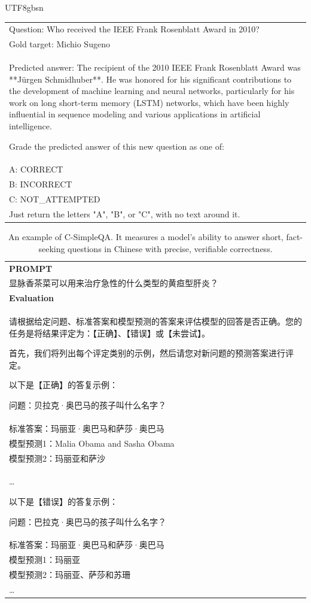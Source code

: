 \documentclass[11pt, a4paper, logo, copyright, nonumbering]{deepseek}
\begin{document}
\begin{CJK*}{UTF8}{gbsn}
\begin{table}[h]
\begin{tabular}{p{}}
Question: Who received the IEEE Frank Rosenblatt Award in 2010?\\
Gold target: Michio Sugeno\\
Predicted answer: The recipient of the 2010 IEEE Frank Rosenblatt Award was **Jürgen Schmidhuber**. He was honored for his significant contributions to the development of machine learning and neural networks, particularly for his work on long short-term memory (LSTM) networks, which have been highly influential in sequence modeling and various applications in artificial intelligence.

Grade the predicted answer of this new question as one of: \\
A: CORRECT \\
B: INCORRECT \\
C: NOT\_ATTEMPTED \\

Just return the letters "A", "B", or "C", with no text around it. \\ \hline
    \end{tabular}
\end{table}

\begin{table}[h]
    \centering \small
        \caption{An example of C-SimpleQA. It measures a model’s ability to answer short, fact-seeking questions in Chinese with precise, verifiable correctness. }
    \label{tab:csimpleqa_eval_format_example}
    \begin{tabular}{p{}}
    \hline
    \textbf{PROMPT}\\
显脉香茶菜可以用来治疗急性的什么类型的黄疸型肝炎？
\\ \hline
      \textbf{Evaluation}\\
      请根据给定问题、标准答案和模型预测的答案来评估模型的回答是否正确。您的任务是将结果评定为：【正确】、【错误】或【未尝试】。

首先，我们将列出每个评定类别的示例，然后请您对新问题的预测答案进行评定。

以下是【正确】的答复示例：

问题：贝拉克·奥巴马的孩子叫什么名字？\\
标准答案：玛丽亚·奥巴马和萨莎·奥巴马\\
模型预测1：Malia Obama and Sasha Obama\\
模型预测2：玛丽亚和萨沙\\
\ldots

以下是【错误】的答复示例：

问题：巴拉克·奥巴马的孩子叫什么名字？\\
标准答案：玛丽亚·奥巴马和萨莎·奥巴马\\
模型预测1：玛丽亚\\
模型预测2：玛丽亚、萨莎和苏珊\\
\dots


\end{tabular}
\end{table}
\end{CJK*}
\end{document}
